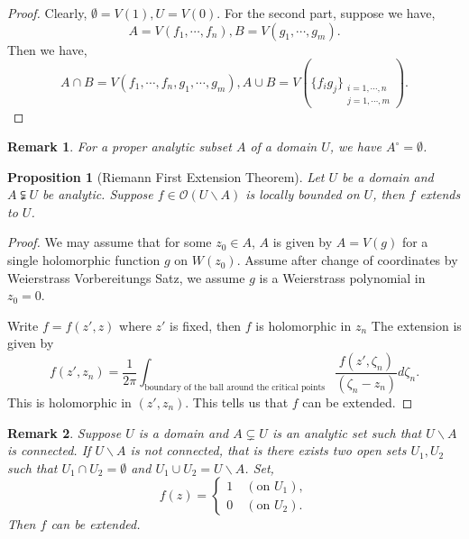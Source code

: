 \documentclass{article}
\newtheorem{proposition}{Proposition}[section]
\newtheorem{remark}{Remark}[section]
\begin{document}
\begin{proof}
  Clearly, $\emptyset = V(1),U = V(0)$. For the second part, suppose we have,
  \begin{equation*}
    A = V(f_1,\cdots,f_n),B=V(g_1,\cdots,g_m).
  \end{equation*}
  Then we have,
  \begin{equation*}
    A\cap B = V(f_1,\cdots,f_n,g_1,\cdots,g_m), A\cup B = V\left(\{f_ig_j\}_{\substack{i=1,\cdots,n\\j=1,\cdots,m}}\right).
  \end{equation*}
\end{proof}

\begin{remark}
  For a proper analytic subset $A$ of a domain $U$, we have $A^\circ = \emptyset$.
\end{remark}

\begin{proposition}[Riemann First Extension Theorem]
  Let $U$ be a domain and $A\subsetneqq U$ be analytic. Suppose $f\in\mathcal{O}(U\backslash A)$ is locally bounded on $U$, then $f$ extends to $U$.
\end{proposition}

\begin{proof}
  We may assume that for some $z_0\in A$, $A$ is given by $A=V(g)$ for a single holomorphic function $g$ on $W(z_0)$. Assume after change of coordinates by Weierstrass Vorbereitungs Satz, we assume $g$ is a Weierstrass polynomial in $z_0=0$.
  \par Write $f=f(z',z)$ where $z'$ is fixed, then $f$ is holomorphic in $z_n$ 
  The extension is given by 
  \begin{equation*}
    f(z',z_n) = {\frac 1 {2\pi}}\int_{{\text{boundary of the ball around the critical points}}}{\frac {f(z',\zeta_n)} {(\zeta_n-z_n)}}d\zeta_n.
  \end{equation*}
  This is holomorphic in $(z',z_n)$. This tells us that $f$ can be extended.
\end{proof}

\begin{remark}
  Suppose $U$ is a domain and $A\subsetneq U$ is an analytic set such that $U\backslash A$ is connected. If $U\backslash A$ is not connected, that is there exists two open sets $U_1,U_2$ such that $U_1\cap U_2=\emptyset$ and $U_1\cup U_2 = U\backslash A$. Set,
  \begin{equation*}
    f(z) = \begin{cases}
      1 \quad (\text{on $U_1$}),\\
      0 \quad (\text{on $U_2$}).
    \end{cases}
  \end{equation*}
  Then $f$ can be extended.
\end{remark}
\end{document}
